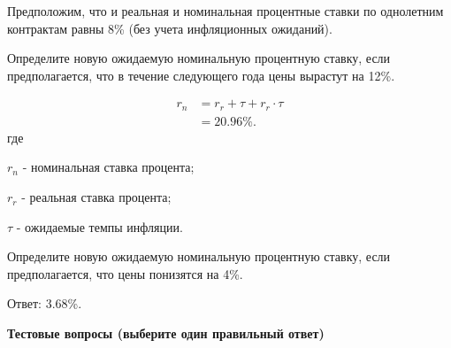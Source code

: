 \documentclass[12pt, table]{exam}
\begin{document}
\begin{questions}
\pagebreak
\question[10] Предположим, что и реальная и номинальная процентные ставки по однолетним контрактам равны 8\% (без учета инфляционных ожиданий).
\noaddpoints

\begin{subparts}
	\subpart[5] Определите новую ожидаемую номинальную процентную ставку, если предполагается, что в течение следующего года цены вырастут на 12\%.
	
	\begin{solution}[12em]
		\begin{align*}
		r_n&=r_r+\tau + r_r \cdot \tau\\
		&=20.96\%.\nonumber
		\end{align*}
		где
	
		$r_n$ - номинальная ставка процента;
		
		$r_r$ - реальная ставка процента;
		
		$\tau$ - ожидаемые темпы инфляции.
	\end{solution}
	
	\subpart[5] Определите новую ожидаемую номинальную процентную ставку, если предполагается, что цены понизятся на 4\%.
	
	\begin{solution}[12em]
		
		\raggedright
		Ответ: 3.68\%.
	\end{solution}
	
\end{subparts}
\addpoints

\end{questions}

\pagebreak
\noindent\textbf{Тестовые вопросы (выберите один правильный ответ)}
\end{document}
